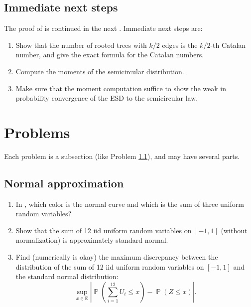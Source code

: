\documentclass[letterpaper,11pt,oneside,reqno]{book}
\numberwithin{equation}{chapter}  %
\theoremstyle{definition}
\begin{document}
\subsection{Immediate next steps}

The proof of  is continued in the next
.
Immediate next steps are:
\begin{enumerate}
	\item Show that the number of rooted trees with $k/2$ edges is the $k/2$-th Catalan number, and give the exact formula for the Catalan numbers.
	\item Compute the moments of the semicircular distribution.
	\item Make sure that the moment computation suffice to show the
		weak in probability convergence of the ESD to the semicircular law.
\end{enumerate}





\section{Problems}

Each problem is a subsection (like Problem \ref{lecture1:prob:normal-approximation}),
and may have several parts.

\subsection{Normal approximation}
\label{lecture1:prob:normal-approximation}

\begin{enumerate}
	\item In , which color is
		the normal curve and which is the sum of three uniform random variables?
	\item Show that the sum of 12 iid uniform random variables on $[-1,1]$
		(without normalization) is approximately standard normal.
	\item Find (numerically is okay)
		the maximum discrepancy between the distribution of the sum of 12 iid uniform random variables on $[-1,1]$ and the standard normal distribution:
		\begin{equation*}
			\sup_{x \in \mathbb{R}} \left| \operatorname{\mathbb{P}}\left(  \sum_{i=1}^{12} U_i \leq x \right) - \operatorname{\mathbb{P}}\left( Z \leq x \right) \right|.
		\end{equation*}
\end{enumerate}
\end{document}
